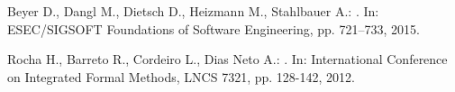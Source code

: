 \documentclass{acm_sen_article}
\begin{document}
\begin{thebibliography}{1}
Beyer D., Dangl M., Dietsch D., Heizmann M., Stahlbauer A.:
. 
\newblock In: ESEC/SIGSOFT Foundations of Software Engineering, pp. 721--733, 2015.

Rocha H., Barreto R., Cordeiro L., Dias Neto A.:
. 
\newblock In: International Conference on Integrated Formal Methods, LNCS 7321, pp. 128-142, 2012.

\end{thebibliography}




\end{document}
